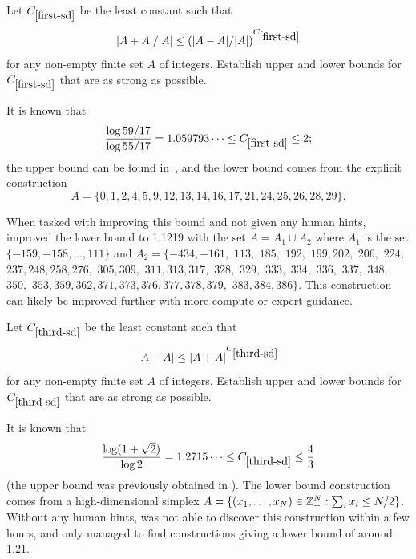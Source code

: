 \renewcommand{\problemURL}{https://google-deepmind.github.io/alphaevolve_repository_of_problems/problems/42.html}

\begin{problem}\label{first-sd} Let $C_{\ref{first-sd}}$ be the least constant such that 
$$ |A+A|/|A| \leq (|A-A|/|A|)^{C_{\ref{first-sd}}}$$
for any non-empty finite set $A$ of integers.   Establish upper and lower bounds for $C_{\ref{first-sd}}$ that are as strong as possible.
\end{problem}

It is known that
$$ \frac{\log 59/17}{\log 55/17} = 1.059793\dots \leq C_{\ref{first-sd}} \leq 2;$$
the upper bound can be found in~\cite[Theorem 4.1]{ruzsa}, and the lower bound comes from the explicit construction
$$ A = \{0,1,2,4,5,9,12,13,14,16,17,21,24,25,26,28,29\}.$$

When tasked with improving this bound and not given any human hints, \AlphaEvolve improved the lower bound to 1.1219 with the set $A = A_1 \cup A_2$ where $A_1$ is the set $\{-159, -158, \ldots, 111\}$ and $A_2 = \{-434, -161,$ $  113,$ $ 185,$ $ 192,$ $ 199, 202,$ $ 206,$ $ 224,$ $ 237, 248, 258, 276,$ $ 305, 309,$ $ 311, 313, 317,$ $ 328,$ $ 329,$ $ 333,$ $ 334,$ $ 336,$ $ 337,$ $ 348,$ $ 350,$ $ 353, 359, 362, 371, 373, 376, 377, 378, 379,$ $ 383, 384, 386\}$. This construction can likely be improved further with more compute or expert guidance.


\renewcommand{\problemURL}{https://google-deepmind.github.io/alphaevolve_repository_of_problems/problems/43.html}

\begin{problem}\label{third-sd} Let $C_{\ref{third-sd}}$ be the least constant such that 
$$ |A-A| \leq |A+A|^{C_{\ref{third-sd}}}$$
for any non-empty finite set $A$ of integers.   Establish upper and lower bounds for $C_{\ref{third-sd}}$ that are as strong as possible.
\end{problem}

 It is known \cite{hennecart} that
$$\frac{\log(1+\sqrt{2})}{\log 2} = 1.2715\dots \leq C_{\ref{third-sd}} \leq \frac{4}{3}$$
(the upper bound was previously obtained in \cite{freiman}). The lower bound construction comes from a high-dimensional simplex $A = \{ (x_1,\dots,x_N) \in \mathbb{Z}_+^N: \sum_i x_i \leq N/2 \}$. Without any human hints, \AlphaEvolve was not able to discover this construction within a few hours, and only managed to find constructions giving a lower bound of around 1.21. 


\renewcommand{\problemURL}{https://google-deepmind.github.io/alphaevolve_repository_of_problems/problems/44.html}

